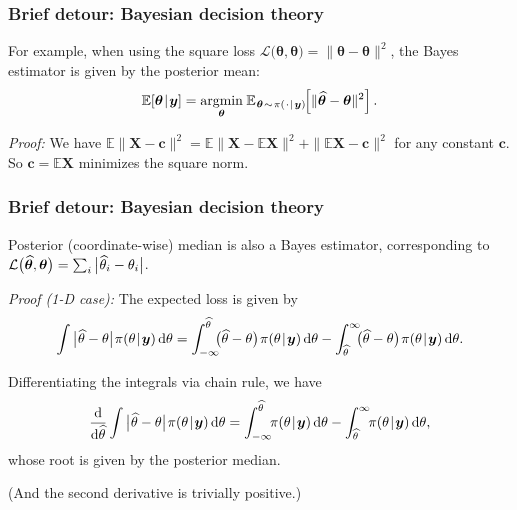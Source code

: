 \documentclass[18pt, handout]{beamer}
\newcommand{\defineTightSpacing}{%
	\setlength{\abovedisplayskip}{.25\baselineskip}%
	\setlength{\belowdisplayskip}{.25\baselineskip}%
}
\renewcommand{\textsc}[1]{{\small \MakeUppercase{#1}}}
\newcommand{\given}{\thinnerspace | \thinnerspace}
\newcommand{\diff}{\operatorname{\mathrm{d}}\!{}}
\DeclareMathOperator*{\argmin}{argmin}
\newcommand{\thinnerspace}{\mskip.5\thinmuskip}
\newcommand{\thinnestspace}{\mskip.25\thinmuskip}
\newcommand{\expectation}{\mathbb{E}}
\newcommand{\density}{\pi}
\newcommand{\by}{\bm{y}}
\newcommand{\btheta}{\bm{\theta}}
\newcommand{\loss}{\mathcal{L}}
\begin{document}
\begin{frame}
\frametitle{Brief detour: Bayesian decision theory}
\smallskip
For example, when using the square loss $\loss\big(\widehat{\btheta}, \btheta \big) = \| \widehat{\btheta} - \btheta\|^2$, the Bayes estimator is given by the posterior mean:
\begin{equation*} \defineTightSpacing%
\expectation\!\left[ \btheta \given \by \right] =
	\argmin_{\btheta} \thinnerspace \expectation_{\thinnerspace \btheta \thinnerspace \sim \thinnerspace \density(\thinnerspace \cdot \given \by)\!}\!\left[
		 \| \widehat{\btheta} - \btheta\|^2
	\right].
\end{equation*}

\textit{Proof:} We have $\expectation \| \mathbf{X} - \mathbf{c} \|^2 = \expectation \| \mathbf{X} - \expectation \mathbf{X} \|^2 + \| \expectation \mathbf{X} - \mathbf{c} \|^2$ for any constant $\mathbf{c}$. 
So $\mathbf{c} = \expectation \mathbf{X}$ minimizes the square norm. \hfill \qedsymbol
\end{frame}


\begin{frame}
\frametitle{Brief detour: Bayesian decision theory}
Posterior (coordinate-wise) median is also a Bayes estimator, corresponding to $\loss\big(\widehat{\btheta}, \btheta \big) = \sum_i \big| \thinnestspace \widehat{\theta}_i - \theta_i \big|$.

\smallskip
\textit{Proof (1-\textsc{D} case):} 
The expected loss is given by
\begin{equation*} \defineTightSpacing%
\int \big| \thinnestspace \widehat{\theta} - \theta \big| \thinnerspace \density(\theta \given \by) \diff \theta
	= \int_{-\infty}^{\widehat{\theta}} \!\!\! \big( \widehat{\theta} - \theta \big) \thinnerspace \density(\theta \given \by) \diff \theta
		- \int_{\widehat{\theta}}^\infty \!\!\! \big( \widehat{\theta} - \theta \big) \thinnerspace \density(\theta \given \by) \diff \theta.
\end{equation*}

Differentiating the integrals via chain rule, we have
\begin{equation*} \defineTightSpacing%
\frac{\diff}{\diff \widehat{\theta}} \int \big| \thinnestspace \widehat{\theta} - \theta \big| \thinnerspace \density(\theta \given \by) \diff \theta
	= \int_{-\infty}^{\widehat{\theta}} \!\! \density(\theta \given \by) \diff \theta
		- \int_{\widehat{\theta}}^\infty \!\! \density(\theta \given \by) \diff \theta,
\end{equation*}
whose root is given by the posterior median.

(And the second derivative is trivially positive.) \hfill \qedsymbol
\end{frame}
\end{document}
